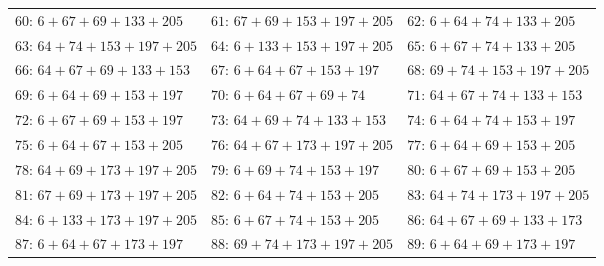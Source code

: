 \begin{center}
\begin{tabular}{lll}
$60$: $6+67+69+133+205$ & $61$: $67+69+153+197+205$ & $62$: $6+64+74+133+205$\\
$63$: $64+74+153+197+205$ & $64$: $6+133+153+197+205$ & $65$: $6+67+74+133+205$\\
$66$: $64+67+69+133+153$ & $67$: $6+64+67+153+197$ & $68$: $69+74+153+197+205$\\
$69$: $6+64+69+153+197$ & $70$: $6+64+67+69+74$ & $71$: $64+67+74+133+153$\\
$72$: $6+67+69+153+197$ & $73$: $64+69+74+133+153$ & $74$: $6+64+74+153+197$\\
$75$: $6+64+67+153+205$ & $76$: $64+67+173+197+205$ & $77$: $6+64+69+153+205$\\
$78$: $64+69+173+197+205$ & $79$: $6+69+74+153+197$ & $80$: $6+67+69+153+205$\\
$81$: $67+69+173+197+205$ & $82$: $6+64+74+153+205$ & $83$: $64+74+173+197+205$\\
$84$: $6+133+173+197+205$ & $85$: $6+67+74+153+205$ & $86$: $64+67+69+133+173$\\
$87$: $6+64+67+173+197$ & $88$: $69+74+173+197+205$ & $89$: $6+64+69+173+197$
\end{tabular}
\end{center}
